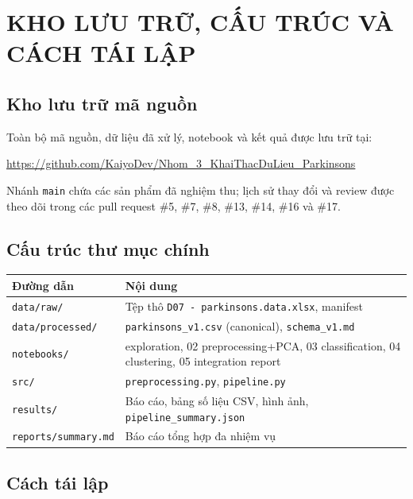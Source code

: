 \chapter{KHO LƯU TRỮ, CẤU TRÚC VÀ CÁCH TÁI LẬP}
\label{app:a}

\section{Kho lưu trữ mã nguồn}

Toàn bộ mã nguồn, dữ liệu đã xử lý, notebook và kết quả được lưu trữ tại:
\begin{center}
    \url{https://github.com/KaiyoDev/Nhom_3_KhaiThacDuLieu_Parkinsons}
\end{center}

Nhánh \texttt{main} chứa các sản phẩm đã nghiệm thu; lịch sử thay đổi và review được theo
dõi trong các pull request \#5, \#7, \#8, \#13, \#14, \#16 và \#17.

\section{Cấu trúc thư mục chính}

\begin{table}[H]
\centering
\begin{tabular}{|l|>{\raggedright\arraybackslash}p{8.4cm}|}
\hline
\textbf{Đường dẫn} & \textbf{Nội dung} \\
\hline
\texttt{data/raw/} & Tệp thô \texttt{D07 - parkinsons.data.xlsx}, manifest \\
\hline
\texttt{data/processed/} & \texttt{parkinsons\_v1.csv} (canonical), \texttt{schema\_v1.md} \\
\hline
\texttt{notebooks/} & 01 exploration, 02 preprocessing+PCA, 03 classification, 04 clustering, 05 integration report \\
\hline
\texttt{src/} & \texttt{preprocessing.py}, \texttt{pipeline.py} \\
\hline
\texttt{results/} & Báo cáo, bảng số liệu CSV, hình ảnh, \texttt{pipeline\_summary.json} \\
\hline
\texttt{reports/summary.md} & Báo cáo tổng hợp đa nhiệm vụ \\
\hline
\end{tabular}
\end{table}

\section{Cách tái lập}


